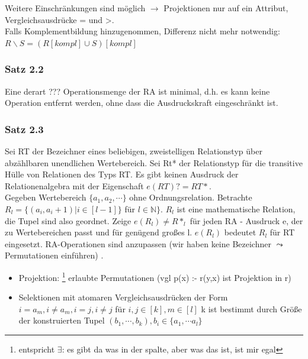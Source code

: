 \documentclass[12pt, a4paper]{article}
\begin{document}
Weitere Einschränkungen sind möglich $\rightarrow$ Projektionen nur auf ein Attribut, Vergleichsausdrücke = und >. \\
Falls Komplementbildung hinzugenommen, Differenz nicht mehr notwendig: \\
$R \backslash S = (R[kompl] \cup S)[kompl]$

\subsubsection*{Satz 2.2}
Eine derart ??? Operationsmenge der RA ist minimal, d.h. es kann keine Operation entfernt werden, ohne dass die Ausdruckskraft eingeschränkt ist.

\subsubsection*{Satz 2.3}
Sei RT der Bezeichner eines beliebigen, zweistelligen Relationstyp über abzählbaren unendlichen Wertebereich. Sei Rt* der Relationstyp für die transitive Hülle von Relationen des Typs RT. Es gibt keinen Ausdruck  der Relationenalgebra mit der Eigenschaft $e(RT) ? = RT*$. \\

Gegeben Wertebereich $\{a_1, a_2, \cdots \}$ ohne Ordnungsrelation. Betrachte $R_l = \{ (a_i, a_i+1) | i \in [l-1] \}$ für $l \in \mathbb{N} \}$. $R_l$ ist eine mathematische Relation, die Tupel sind also geordnet. Zeige $e(R_l) \neq R*_l$ für jeden RA - Ausdruck e, der zu Wertebereichen passt und für genügend großes l. $e(R_l)$ bedeutet $R_l$ für RT eingesetzt. RA-Operationen sind anzupassen (wir haben keine Bezeichner $\leadsto$ Permutationen einführen) .
\begin{itemize}
	\item Projektion: \footnote{entspricht $\exists$: es gibt da was in der spalte, aber was das ist, ist mir egal} erlaubte Permutationen (vgl p(x) :- r(y,x) ist Projektion in r)
	\item Selektionen mit atomaren Vergleichsausdrücken der Form $i = a_m, i \neq a_m, i = j, i \neq j$ für $i,j \in [k], m \in [l]$ k ist bestimmt durch Größe der konstruierten Tupel $(b_1, \cdots, b_k), b_i \in \{a_1, \cdots a_l \}$
\end{itemize}
\end{document}
